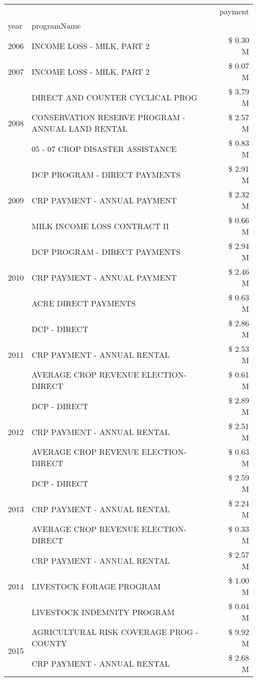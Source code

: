 \begin{tabular}{llr}
\toprule
 &  & payment \\
year & programName &  \\
\midrule
2006 & INCOME LOSS - MILK, PART 2 & \$ 0.30 M \\
\cline{1-3}
2007 & INCOME LOSS - MILK, PART 2 & \$ 0.07 M \\
\cline{1-3}
\multirow[t]{3}{*}{2008} & DIRECT AND COUNTER CYCLICAL PROG & \$ 3.79 M \\
 & CONSERVATION RESERVE PROGRAM - ANNUAL LAND RENTAL & \$ 2.57 M \\
 & 05 - 07 CROP DISASTER ASSISTANCE & \$ 0.83 M \\
\cline{1-3}
\multirow[t]{3}{*}{2009} & DCP PROGRAM - DIRECT PAYMENTS & \$ 2.91 M \\
 & CRP PAYMENT - ANNUAL PAYMENT & \$ 2.32 M \\
 & MILK INCOME LOSS CONTRACT II & \$ 0.66 M \\
\cline{1-3}
\multirow[t]{3}{*}{2010} & DCP PROGRAM - DIRECT PAYMENTS & \$ 2.94 M \\
 & CRP PAYMENT - ANNUAL PAYMENT & \$ 2.46 M \\
 & ACRE DIRECT PAYMENTS & \$ 0.63 M \\
\cline{1-3}
\multirow[t]{3}{*}{2011} & DCP - DIRECT & \$ 2.86 M \\
 & CRP PAYMENT - ANNUAL RENTAL & \$ 2.53 M \\
 & AVERAGE CROP REVENUE ELECTION-DIRECT & \$ 0.61 M \\
\cline{1-3}
\multirow[t]{3}{*}{2012} & DCP - DIRECT & \$ 2.89 M \\
 & CRP PAYMENT - ANNUAL RENTAL & \$ 2.51 M \\
 & AVERAGE CROP REVENUE ELECTION-DIRECT & \$ 0.63 M \\
\cline{1-3}
\multirow[t]{3}{*}{2013} & DCP - DIRECT & \$ 2.59 M \\
 & CRP PAYMENT - ANNUAL RENTAL & \$ 2.24 M \\
 & AVERAGE CROP REVENUE ELECTION-DIRECT & \$ 0.33 M \\
\cline{1-3}
\multirow[t]{3}{*}{2014} & CRP PAYMENT - ANNUAL RENTAL & \$ 2.57 M \\
 & LIVESTOCK FORAGE PROGRAM & \$ 1.00 M \\
 & LIVESTOCK INDEMNITY PROGRAM & \$ 0.04 M \\
\cline{1-3}
\multirow[t]{3}{*}{2015} & AGRICULTURAL RISK COVERAGE PROG - COUNTY & \$ 9.92 M \\
 & CRP PAYMENT - ANNUAL RENTAL & \$ 2.68 M \\

\end{tabular}
